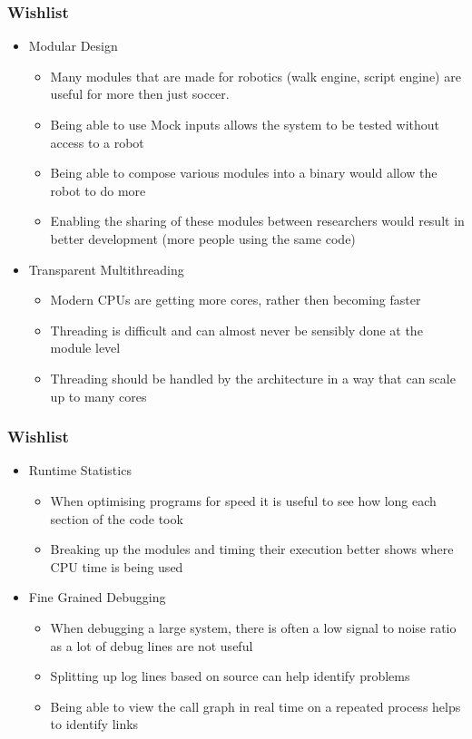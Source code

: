 \documentclass{beamer}
\begin{document}
\begin{frame}
	\frametitle{Wishlist}
	\begin{itemize}
		\item Modular Design
			\begin{itemize}
				\item Many modules that are made for robotics (walk engine, script engine) are useful for more then just soccer.
				\item Being able to use Mock inputs allows the system to be tested without access to a robot
				\item Being able to compose various modules into a binary would allow the robot to do more
				\item Enabling the sharing of these modules between researchers would result in better development (more people using the same code)
			\end{itemize}
			
		\item Transparent Multithreading
			\begin{itemize}
				\item Modern CPUs are getting more cores, rather then becoming faster
				\item Threading is difficult and can almost never be sensibly done at the module level
				\item Threading should be handled by the architecture in a way that can scale up to many cores
			\end{itemize}
	\end{itemize}
\end{frame}
			
\begin{frame}
	\frametitle{Wishlist}
	\begin{itemize}
		\item Runtime Statistics
			\begin{itemize}
				\item When optimising programs for speed it is useful to see how long each section of the code took
				\item Breaking up the modules and timing their execution better shows where CPU time is being used
			\end{itemize}
			
		\item Fine Grained Debugging
			\begin{itemize}
				\item When debugging a large system, there is often a low signal to noise ratio as a lot of debug lines are not useful
				\item Splitting up log lines based on source can help identify problems
				\item Being able to view the call graph in real time on a repeated process helps to identify links
			\end{itemize}
	\end{itemize}
\end{frame}
\end{document}
